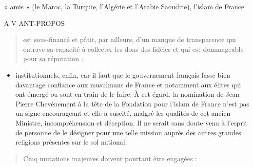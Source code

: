 « amis » (le Maroc, la Turquie, l'Algérie et l'Arabie Saoudite), l'islam
de France

A V ANT-PROPOS

\begin{quote}
est sous-financé et pâtit, par ailleurs, d'un manque de transparence qui
entrave sa capacité à collecter les dons des fidèles et qui est
dommageable pour sa réputation ;
\end{quote}

\begin{itemize}
\item
  institutionnels, enfin, car il faut que le gouvernement français fasse
  bien davantage confiance aux musulmans de France et notamment aux
  élites qui ont émergé ou sont en train de le faire. À cet égard, la
  nomination de Jean-Pierre Chevènement à la tête de la Fondation pour
  l'islam de France n'est pas un signe encourageant et elle a suscité,
  malgré les qualités de cet ancien Ministre, incompréhension et
  déception. Il ne serait sans doute venu à l'esprit de personne de le
  désigner pour une telle mission auprès des autres grandes religions
  présentes sur le sol national.
\end{itemize}

\begin{quote}
Cinq mutations majeures doivent pourtant être engagées :
\end{quote}

